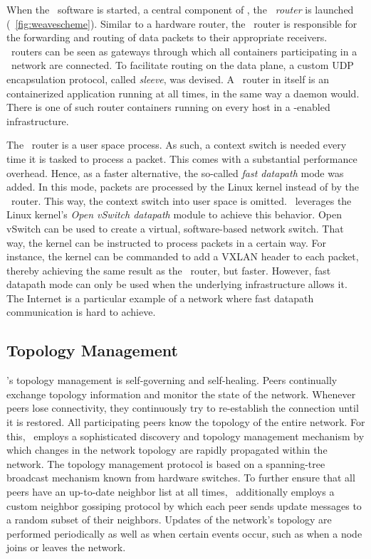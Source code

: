When the \weave\ software is started, a central component of \wnet , the \emph{\weave\ router} is launched (\cf\ \autoref{fig:weavescheme}). Similar to a hardware router, the \weave\ router is responsible for the forwarding and routing of data packets to their appropriate receivers. \weave\ routers can be seen as gateways through which all containers participating in a \weave\ network are connected. To facilitate routing on the data plane, a custom UDP encapsulation protocol, called \emph{sleeve}, was devised. A \weave\ router in itself is an containerized application running at all times, in the same way a daemon would. There is one of such router containers running on every host in a \weave -enabled infrastructure.


The \weave\ router is a user space process. As such, a context switch is needed every time it is tasked to process a packet. This comes with a substantial performance overhead. Hence, as a faster alternative, the so-called \emph{fast datapath} mode was added. In this mode, packets are processed by the Linux kernel instead of by the \weave\ router. This way, the context switch into user space is omitted. \wnet\ leverages the Linux kernel's \emph{Open vSwitch datapath} module \cite{pfaff2015design} to achieve this behavior. Open vSwitch can be used to create a virtual, software-based network switch. That way, the kernel can be instructed to process packets in a certain way. For instance, the kernel can be commanded to add a VXLAN header to each packet, thereby achieving the same result as the \weave\ router, but faster. However, fast datapath mode can only be used when the underlying infrastructure allows it. The Internet is a particular example of a network where fast datapath communication is hard to achieve.


\subsection{Topology Management} 
\weave 's topology management is self-governing and self-healing. Peers continually exchange topology information and monitor the state of the network. Whenever peers lose connectivity, they continuously try to re-establish the connection until it is restored. All participating peers know the topology of the entire network. For this, \wnet\ employs a sophisticated discovery and topology management mechanism by which changes in the network topology are rapidly propagated within the network. The topology management protocol is based on a spanning-tree broadcast mechanism known from hardware switches. To further ensure that all peers have an up-to-date neighbor list at all times, \wnet\ additionally employs a custom neighbor gossiping protocol by which each peer sends update messages to a random subset of their neighbors. Updates of the network's topology are performed periodically as well as when certain events occur, such as when a node joins or leaves the network.

